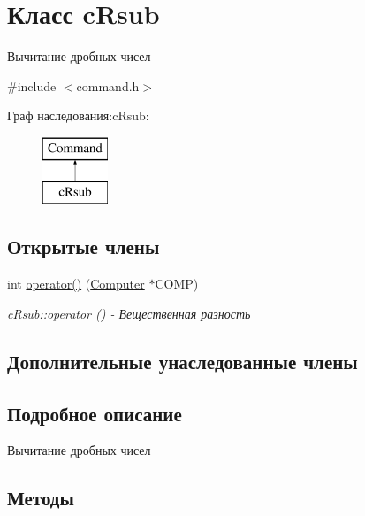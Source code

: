 \hypertarget{classc_rsub}{}\section{Класс c\+Rsub}
\label{classc_rsub}


Вычитание дробных чисел  




{\ttfamily \#include $<$command.\+h$>$}

Граф наследования\+:c\+Rsub\+:\begin{figure}[H]
\begin{center}
\leavevmode
\includegraphics[height=2.000000cm]{classc_rsub}
\end{center}
\end{figure}
\subsection*{Открытые члены}
\begin{DoxyCompactItemize}
\item 
int \hyperlink{classc_rsub_a270572d89750986cbb1258f765965875}{operator()} (\hyperlink{class_computer}{Computer} $\ast$C\+O\+MP)
\begin{DoxyCompactList}\small\item\em c\+Rsub\+::operator () -\/ Вещественная разность \end{DoxyCompactList}\end{DoxyCompactItemize}
\subsection*{Дополнительные унаследованные члены}


\subsection{Подробное описание}
Вычитание дробных чисел 

\subsection{Методы}
\hypertarget{classc_rsub_a270572d89750986cbb1258f765965875}{}\label{classc_rsub_a270572d89750986cbb1258f765965875} 
